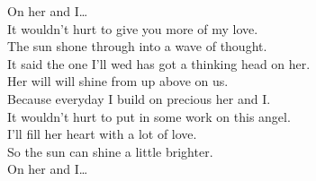 On her and I… \\

It wouldn't hurt to give you more of my love. \\
The sun shone through into a wave of thought. \\
It said the one I'll wed has got a thinking head on her. \\
Her will will shine from up above on us. \\

Because everyday I build on precious her and I. \\
It wouldn't hurt to put in some work on this angel. \\
I'll fill her heart with a lot of love. \\
So the sun can shine a little brighter. \\

On her and I… \\
